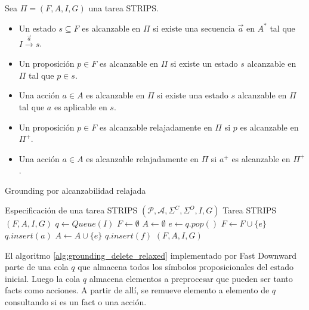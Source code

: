 \begin{mydef}
    Sea $\Pi = (F, A, I, G)$ una tarea STRIPS.    
    \begin{itemize}
        \item Un estado $s \subseteq F$ es alcanzable en $\Pi$ si existe una
        secuencia $\vec{a}$ en $A^{*}$ tal que $I \xrightarrow{\vec{a}} s$.
    
        \item Un proposición $p \in F$ es alcanzable en $\Pi$ si existe un
        estado $s$ alcanzable en $\Pi$ tal que $p \in s$.

        \item Una acción $a \in A$ es alcanzable en $\Pi$ si existe una estado
        $s$ alcanzable en $\Pi$ tal que $a$ es aplicable en $s$.

        \item Un proposición $p \in F$ es alcanzable relajadamente en $\Pi$ si
        $p$ es alcanzable en $\Pi^{+}$.

        \item Una acción $a \in A$ es alcanzable relajadamente en $\Pi$ si
        $a^{+}$ es alcanzable en $\Pi^{+}$.
    \end{itemize}
\end{mydef}


\begin{algorithm}
    \caption{Grounding por alcanzabilidad
    relajada}\label{alg:grounding_delete_relaxed}
    \begin{algorithmic}[1]
    \Require Especificación de una tarea STRIPS $(\mathcal{P}, \mathcal{A},
    \Sigma^{C}, \Sigma^{O}, I, G)$ \Ensure Tarea STRIPS $(F, A, I, G)$ \State $q
    \gets Queue(I)$ \State $F \gets \emptyset$ \State $A \gets \emptyset$
     \State $e \gets q.pop()$  \State
    $F \gets F \cup \{e\}$  \State
    $q.insert(a)$ \EndFor \Else \State $A \gets A \cup \{e\}$  \State $q.insert(f)$ \EndFor \EndIf \EndWhile \State
    \Return $(F, A, I, G)$
    \end{algorithmic}
\end{algorithm}

El algoritmo \ref{alg:grounding_delete_relaxed} implementado por Fast Downward
parte de una cola $q$ que almacena todos los símbolos proposicionales del estado
inicial. Luego la cola $q$ almacena elementos a preprocesar que pueden ser tanto
facts como acciones. A partir de allí, se remueve elemento a elemento de $q$
consultando si es un fact o una acción.

